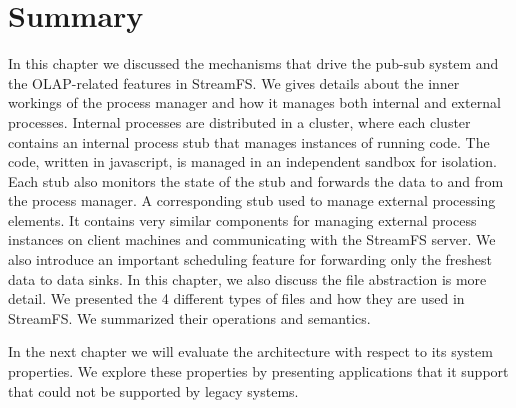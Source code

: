 \section{Summary}

In this chapter we discussed the mechanisms that drive the pub-sub system and the OLAP-related features in StreamFS.
We gives details about the inner workings of the process manager and how it manages both internal and external processes.
Internal processes are distributed in a cluster, where each cluster contains an internal process stub that manages 
instances of running code.  The code, written in javascript, is managed in an independent sandbox for isolation.  Each
stub also monitors the state of the stub and forwards the data to and from the process manager.
A corresponding stub used to manage external processing elements.  It contains very similar components for managing
external process instances on client machines and communicating with the StreamFS server.
We also introduce an important scheduling feature for forwarding only the freshest data to data sinks.
In this chapter, we also discuss the file abstraction is more detail.  We presented the 4 different types of files and how they
are used in StreamFS.  We summarized their operations and semantics.  

In the next chapter we will evaluate the architecture with respect to its system properties.  We explore these properties by
presenting applications that it support that could not be supported by legacy systems.
